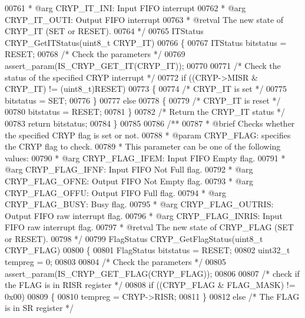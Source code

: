 \begin{DoxyCode}
00761 \textcolor{comment}{  *            @arg CRYP\_IT\_INI: Input FIFO interrupt}
00762 \textcolor{comment}{  *            @arg CRYP\_IT\_OUTI: Output FIFO interrupt}
00763 \textcolor{comment}{  * @retval The new state of CRYP\_IT (SET or RESET).}
00764 \textcolor{comment}{  */}
00765 ITStatus CRYP_GetITStatus(uint8\_t CRYP\_IT)
00766 \{
00767   ITStatus bitstatus = RESET;
00768   \textcolor{comment}{/* Check the parameters */}
00769   assert_param(IS\_CRYP\_GET\_IT(CRYP\_IT));
00770 
00771   \textcolor{comment}{/* Check the status of the specified CRYP interrupt */}
00772   \textcolor{keywordflow}{if} ((CRYP->MISR &  CRYP\_IT) != (uint8\_t)RESET)
00773   \{
00774     \textcolor{comment}{/* CRYP\_IT is set */}
00775     bitstatus = SET;
00776   \}
00777   \textcolor{keywordflow}{else}
00778   \{
00779     \textcolor{comment}{/* CRYP\_IT is reset */}
00780     bitstatus = RESET;
00781   \}
00782   \textcolor{comment}{/* Return the CRYP\_IT status */}
00783   \textcolor{keywordflow}{return} bitstatus;
00784 \}
00785 
00786 \textcolor{comment}{/**}
00787 \textcolor{comment}{  * @brief  Checks whether the specified CRYP flag is set or not.}
00788 \textcolor{comment}{  * @param  CRYP\_FLAG: specifies the CRYP flag to check.}
00789 \textcolor{comment}{  *          This parameter can be one of the following values:}
00790 \textcolor{comment}{  *            @arg CRYP\_FLAG\_IFEM: Input FIFO Empty flag.}
00791 \textcolor{comment}{  *            @arg CRYP\_FLAG\_IFNF: Input FIFO Not Full flag.}
00792 \textcolor{comment}{  *            @arg CRYP\_FLAG\_OFNE: Output FIFO Not Empty flag.}
00793 \textcolor{comment}{  *            @arg CRYP\_FLAG\_OFFU: Output FIFO Full flag.}
00794 \textcolor{comment}{  *            @arg CRYP\_FLAG\_BUSY: Busy flag.}
00795 \textcolor{comment}{  *            @arg CRYP\_FLAG\_OUTRIS: Output FIFO raw interrupt flag.}
00796 \textcolor{comment}{  *            @arg CRYP\_FLAG\_INRIS: Input FIFO raw interrupt flag.}
00797 \textcolor{comment}{  * @retval The new state of CRYP\_FLAG (SET or RESET).}
00798 \textcolor{comment}{  */}
00799 FlagStatus CRYP_GetFlagStatus(uint8\_t CRYP\_FLAG)
00800 \{
00801   FlagStatus bitstatus = RESET;
00802   uint32\_t tempreg = 0;
00803 
00804   \textcolor{comment}{/* Check the parameters */}
00805   assert_param(IS\_CRYP\_GET\_FLAG(CRYP\_FLAG));
00806 
00807   \textcolor{comment}{/* check if the FLAG is in RISR register */}
00808   \textcolor{keywordflow}{if} ((CRYP\_FLAG & FLAG_MASK) != 0x00)
00809   \{
00810     tempreg = CRYP->RISR;
00811   \}
00812   \textcolor{keywordflow}{else}  \textcolor{comment}{/* The FLAG is in SR register */}

\end{DoxyCode}
